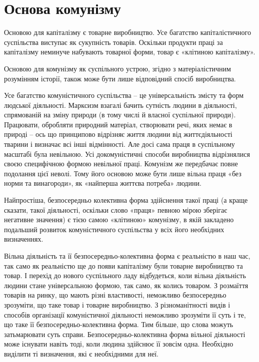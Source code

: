 \documentclass[../main]{subfiles}
\begin{document}
\ifSubfilesClassLoaded{\setcounter{page}{14}}{}
\section{Основа комунізму}
\label{sec:03_osnovanie}

Основою для капіталізму є товарне виробництво. Усе багатство капіталістичного суспільства виступає як сукупність товарів. Оскільки продукти праці за капіталізму неминуче набувають товарної форми, товар є «клітиною капіталізму».

Основою для комунізму як суспільного устрою, згідно з матеріалістичним розумінням історії, також може бути лише відповідний спосіб виробництва.

Усе багатство комуністичного суспільства – це універсальність змісту та форм людської діяльності. Марксизм взагалі бачить сутність людини в діяльності, спрямованій на зміну природи (в тому числі й власної суспільної природи). Працювати, обробляти природний матеріал, створювати речі, яких немає в природі – ось що принципово відрізняє життя людини від життєдіяльності тварини і визначає всі інші відмінності. Але досі сама праця в суспільному масштабі була невільною. Усі докомуністичні способи виробництва відрізнялися своєю специфічною формою невільної праці. Комунізм же передбачає повне подолання цієї неволі. Тому його основою може бути лише вільна праця «без норми та винагороди», як «найперша життєва потреба» людини.

Найпростіша, безпосередньо колективна форма здійснення такої праці (а краще сказати, такої діяльності, оскільки слово «праця» певною мірою зберігає негативне значення) є тією самою «клітиною» комунізму, в якій закладено подальший розвиток комуністичного суспільства у всіх його необхідних визначеннях.

Вільна діяльність та її безпосередньо-колективна форма є реальністю в наш час, так само як реальністю ще до появи капіталізму були товарне виробництво та товар. І перехід до нового суспільного ладу відбудеться, коли вільна діяльність людини стане універсальною формою, так само, як колись товаром. З розмаїття товарів на ринку, що мають різні властивості, неможливо безпосередньо зрозуміти, що таке товар і товарне виробництво. З різноманітності видів і способів організації комуністичної діяльності неможливо зрозуміти її суть і те, що таке її безпосередньо-колективна форма. Тим більше, що слова можуть затьмарювати суть справи. Безпосередньо-колективна форма вільної діяльності може існувати навіть тоді, коли людина здійснює її зовсім одна. Необхідно виділити ті визначення, які є необхідними для неї.
\end{document}
